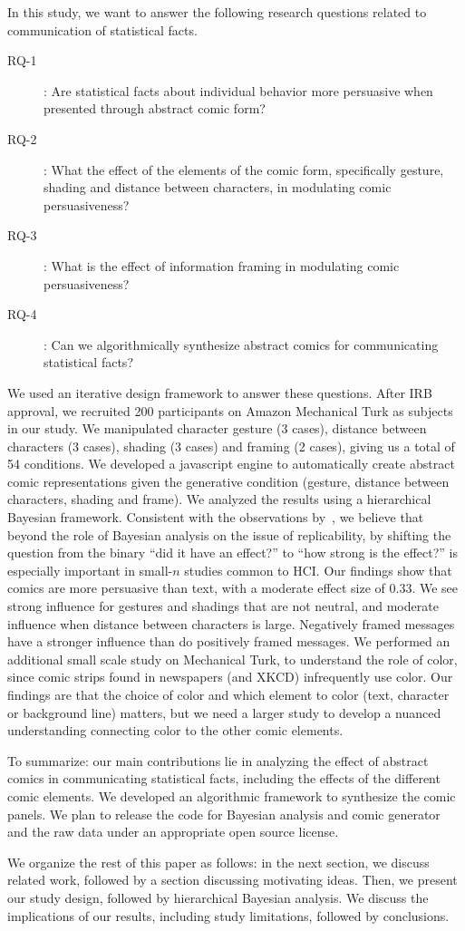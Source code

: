 In this study, we want to answer the following research questions related to communication of statistical facts.

\begin{description}
 \item[RQ-1]: Are statistical facts about individual behavior more persuasive when presented through abstract comic form?
 \item [RQ-2]: What the effect of the elements of the comic form, specifically gesture, shading and distance between characters, in modulating comic persuasiveness?
 \item [RQ-3]: What is the effect of information framing in modulating comic persuasiveness?
 \item [RQ-4]: Can we algorithmically synthesize abstract comics for communicating statistical facts?
\end{description}

We used an iterative design framework to answer these questions. After IRB approval, we recruited 200 participants on Amazon Mechanical Turk as subjects in our study. We manipulated character gesture (3 cases), distance between characters (3 cases), shading (3 cases) and framing (2 cases), giving us a total of 54 conditions. We developed a javascript engine to automatically create abstract comic representations given the generative condition (gesture, distance between characters, shading and frame). We analyzed the results using a hierarchical Bayesian framework. Consistent with the observations by~\textcite{Kay2016}, we believe that beyond the role of Bayesian analysis on the issue of replicability, by shifting the question from the binary ``did it have an effect?'' to ``how strong is the effect?'' is especially important in small-$n$ studies common to HCI. Our findings show that comics are more persuasive than text, with a moderate effect size of 0.33. We see strong influence for gestures and shadings that are not neutral, and moderate influence when distance between characters is large. Negatively framed messages have a stronger influence than do positively framed messages. We performed an additional small scale study on Mechanical Turk, to understand the role of color, since comic strips found in newspapers (and XKCD) infrequently use color. Our findings are that the choice of color and which element to color (text, character or background line) matters, but we need a larger study to develop a nuanced understanding connecting color to the other comic elements.

To summarize: our main contributions lie in analyzing the effect of abstract comics in communicating statistical facts, including the effects of the different comic elements. We developed an algorithmic framework to synthesize the comic panels. We plan to release the code for Bayesian analysis and comic generator and the raw data under an appropriate open source license.

We organize the rest of this paper as follows: in the next section, we discuss related work, followed by a section discussing motivating ideas. Then, we present our study design, followed by hierarchical Bayesian analysis. We discuss the implications of our results, including study limitations, followed by conclusions.
